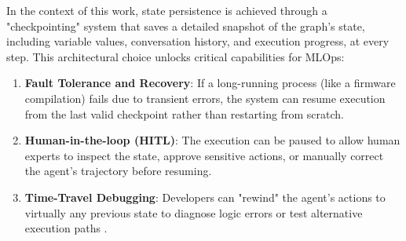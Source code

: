 In the context of this work, state persistence is achieved through a "checkpointing" system that saves a detailed snapshot of the graph's state, including variable values, conversation history, and execution progress, at every step.
This architectural choice unlocks critical capabilities for MLOps:
\begin{enumerate}
    \item \textbf{Fault Tolerance and Recovery}: If a long-running process (like a firmware compilation) fails due to transient errors, the system can resume execution from the last valid checkpoint rather than restarting from scratch.
    \item \textbf{Human-in-the-loop (HITL)}: The execution can be paused to allow human experts to inspect the state, approve sensitive actions, or manually correct the agent's trajectory before resuming.
    \item \textbf{Time-Travel Debugging}: Developers can "rewind" the agent's actions to virtually any previous state to diagnose logic errors or test alternative execution paths \cite{wang2025stateful}.
\end{enumerate}
